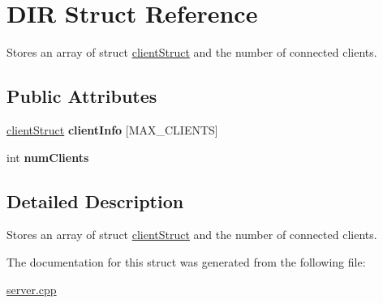\hypertarget{structDIR}{
\section{DIR Struct Reference}
\label{structDIR}
}


Stores an array of struct \hyperlink{structclientStruct}{clientStruct} and the number of connected clients.  
\subsection*{Public Attributes}
\begin{DoxyCompactItemize}
\item 
\hypertarget{structDIR_a9aa2b8eb63710b21d450ba00586f0481}{
\hyperlink{structclientStruct}{clientStruct} {\bfseries clientInfo} \mbox{[}MAX\_\-CLIENTS\mbox{]}}
\label{structDIR_a9aa2b8eb63710b21d450ba00586f0481}

\item 
\hypertarget{structDIR_a53918be296015e6114f8e00294ed1256}{
int {\bfseries numClients}}
\label{structDIR_a53918be296015e6114f8e00294ed1256}

\end{DoxyCompactItemize}


\subsection{Detailed Description}
Stores an array of struct \hyperlink{structclientStruct}{clientStruct} and the number of connected clients. 

The documentation for this struct was generated from the following file:\begin{DoxyCompactItemize}
\item 
\hyperlink{server_8cpp}{server.cpp}\end{DoxyCompactItemize}
